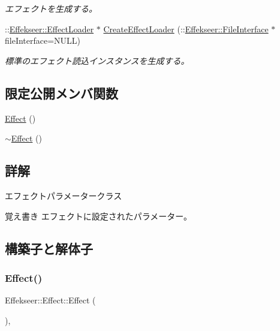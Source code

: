 \begin{DoxyCompactItemize}
\begin{DoxyCompactList}\small\item\em エフェクトを生成する。 \end{DoxyCompactList}\item 
\+::\mbox{\hyperlink{class_effekseer_1_1_effect_loader}{Effekseer\+::\+Effect\+Loader}} $\ast$ \mbox{\hyperlink{class_effekseer_1_1_effect_a462e3f0ea00c20329789521ba47bd2d4}{Create\+Effect\+Loader}} (\+::\mbox{\hyperlink{class_effekseer_1_1_file_interface}{Effekseer\+::\+File\+Interface}} $\ast$file\+Interface=N\+U\+LL)
\begin{DoxyCompactList}\small\item\em 標準のエフェクト読込インスタンスを生成する。 \end{DoxyCompactList}\end{DoxyCompactItemize}
\subsection*{限定公開メンバ関数}
\begin{DoxyCompactItemize}
\item 
\mbox{\hyperlink{class_effekseer_1_1_effect_ac36d4aa804244d12a64ad8e2f9681ed0}{Effect}} ()
\item 
\mbox{\hyperlink{class_effekseer_1_1_effect_a1548bfc590a25a1515dbbb2d5923b7be}{$\sim$\+Effect}} ()
\end{DoxyCompactItemize}


\subsection{詳解}
エフェクトパラメータークラス 

\begin{DoxyNote}{覚え書き}
エフェクトに設定されたパラメーター。 
\end{DoxyNote}


\subsection{構築子と解体子}
\mbox{\label{class_effekseer_1_1_effect_ac36d4aa804244d12a64ad8e2f9681ed0}} 
\subsubsection{\texorpdfstring{Effect()}{Effect()}}
{\footnotesize\ttfamily Effekseer\+::\+Effect\+::\+Effect (\begin{DoxyParamCaption}{ }\end{DoxyParamCaption})\hspace{0.3cm}{\ttfamily [inline]}, {\ttfamily [protected]}}

